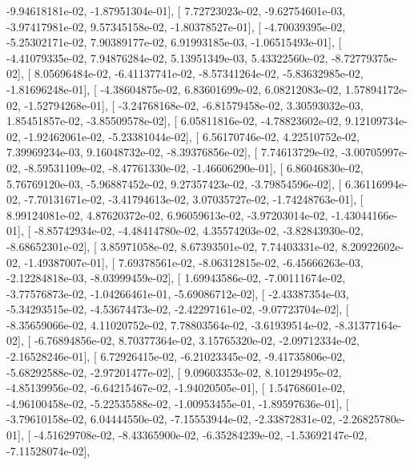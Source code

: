 \documentclass{article}
\begin{document}
         -9.94618181e-02,  -1.87951304e-01],
       [  7.72723023e-02,  -9.62754601e-03,  -3.97417981e-02,
          9.57345158e-02,  -1.80378527e-01],
       [ -4.70039395e-02,  -5.25302171e-02,   7.90389177e-02,
          6.91993185e-03,  -1.06515493e-01],
       [ -4.41079335e-02,   7.94876284e-02,   5.13951349e-03,
          5.43322560e-02,  -8.72779375e-02],
       [  8.05696484e-02,  -6.41137741e-02,  -8.57341264e-02,
         -5.83632985e-02,  -1.81696248e-01],
       [ -4.38604875e-02,   6.83601699e-02,   6.08212083e-02,
          1.57894172e-02,  -1.52794268e-01],
       [ -3.24768168e-02,  -6.81579458e-02,   3.30593032e-03,
          1.85451857e-02,  -3.85509578e-02],
       [  6.05811816e-02,  -4.78823602e-02,   9.12109734e-02,
         -1.92462061e-02,  -5.23381044e-02],
       [  6.56170746e-02,   4.22510752e-02,   7.39969234e-03,
          9.16048732e-02,  -8.39376856e-02],
       [  7.74613729e-02,  -3.00705997e-02,  -8.59531109e-02,
         -8.47761330e-02,  -1.46606290e-01],
       [  6.86046830e-02,   5.76769120e-03,  -5.96887452e-02,
          9.27357423e-02,  -3.79854596e-02],
       [  6.36116994e-02,  -7.70131671e-02,  -3.41794613e-02,
          3.07035727e-02,  -1.74248763e-01],
       [  8.99124081e-02,   4.87620372e-02,   6.96059613e-02,
         -3.97203014e-02,  -1.43044166e-01],
       [ -8.85742934e-02,  -4.48414780e-02,   4.35574203e-02,
         -3.82843930e-02,  -8.68652301e-02],
       [  3.85971058e-02,   8.67393501e-02,   7.74403331e-02,
          8.20922602e-02,  -1.49387007e-01],
       [  7.69378561e-02,  -8.06312815e-02,  -6.45666263e-03,
         -2.12284818e-03,  -8.03999459e-02],
       [  1.69943586e-02,  -7.00111674e-02,  -3.77576873e-02,
         -1.04266461e-01,  -5.69086712e-02],
       [ -2.43387354e-03,  -5.34293515e-02,  -4.53674473e-02,
         -2.42297161e-02,  -9.07723704e-02],
       [ -8.35659066e-02,   4.11020752e-02,   7.78803564e-02,
         -3.61939514e-02,  -8.31377164e-02],
       [ -6.76894856e-02,   8.70377364e-02,   3.15765320e-02,
         -2.09712334e-02,  -2.16528246e-01],
       [  6.72926415e-02,  -6.21023345e-02,  -9.41735806e-02,
         -5.68292588e-02,  -2.97201477e-02],
       [  9.09603353e-02,   8.10129495e-02,  -4.85139956e-02,
         -6.64215467e-02,  -1.94020505e-01],
       [  1.54768601e-02,  -4.96100458e-02,  -5.22535588e-02,
         -1.00953455e-01,  -1.89597636e-01],
       [ -3.79610158e-02,   6.04444550e-02,  -7.15553944e-02,
         -2.33872831e-02,  -2.26825780e-01],
       [ -4.51629708e-02,  -8.43365900e-02,  -6.35284239e-02,
         -1.53692147e-02,  -7.11528074e-02],
\end{document}
